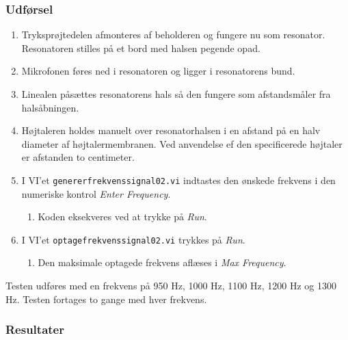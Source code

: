 		\subsubsection{Udførsel}
			
			\begin{enumerate}
				\item Tryksprøjtedelen afmonteres af beholderen og fungere nu som resonator. Resonatoren stilles på et bord med halsen pegende opad. 
				\item Mikrofonen føres ned i resonatoren og ligger i resonatorens bund. 
				\item Linealen påsættes resonatorens hals så den fungere som afstandsmåler fra halsåbningen.
				\item Højtaleren holdes manuelt over resonatorhalsen i en afstand på en halv diameter af højtalermembranen. Ved anvendelse ef den specificerede højtaler er afstanden to centimeter. 
				\item I VI'et \texttt{genererfrekvenssignal02.vi} indtastes den ønskede frekvens i den numeriske kontrol \textit{Enter Frequency}. 
					\begin{enumerate}
						\item Koden eksekveres ved at trykke på \textit{Run}. 
					\end{enumerate} 
				\item I VI'et \texttt{optagefrekvenssignal02.vi} trykkes på \textit{Run}. 
					\begin{enumerate}
						\item Den maksimale optagede frekvens aflæses i \textit{Max Frequency}. 
					\end{enumerate}	 	
			\end{enumerate}
			
			Testen udføres med en frekvens på 950 Hz, 1000 Hz, 1100 Hz, 1200 Hz og 1300 Hz. Testen fortages to gange med hver frekvens.  
			
			\subsubsection{Resultater}
			

